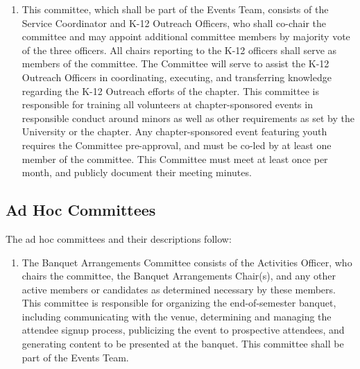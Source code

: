 \begin{enumerate}
work with the executive committee and the advisory board to refine and develop
the chapter’s objectives with regard to Diversity, Equity, and Inclusion as well as to
implement such objectives. The committee will submit a report of its activities and
progress to the chapter via the Cornerstone at least 2 times per semester.
    \item {}
    This committee, which shall be part of the Events
Team, consists of the Service Coordinator and K-12 Outreach Officers, who shall co-chair
the committee and may appoint additional committee members by majority
vote of the three officers. All chairs reporting to the K-12 officers shall serve as members
of the committee. The Committee will serve to assist the K-12 Outreach Officers
in coordinating, executing, and transferring knowledge regarding the K-12 Outreach
efforts of the chapter. This committee is responsible for training all volunteers at
chapter-sponsored events in responsible conduct around minors as well as other requirements
as set by the University or the chapter. Any chapter-sponsored event
featuring youth requires the Committee pre-approval, and must be co-led by at least
one member of the committee. This Committee must meet at least once per month,
and publicly document their meeting minutes.
\end{enumerate}


\subsection{Ad Hoc Committees} \label{G.3}

The ad hoc committees and their descriptions follow:
\begin{enumerate}
    \item {}
    The Banquet Arrangements Committee consists
of the Activities Officer, who chairs the committee, the Banquet Arrangements
Chair(s), and any other active members or candidates as determined necessary by
these members. This committee is responsible for organizing the end-of-semester
banquet, including communicating with the venue, determining and managing the
attendee signup process, publicizing the event to prospective attendees, and generating
content to be presented at the banquet. This committee shall be part of the Events
Team.
\end{enumerate}